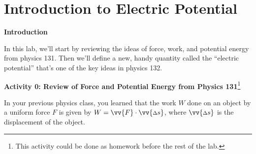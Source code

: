 \section{Introduction to Electric Potential}
\label{potential_intro}


\makelabheader %

\bigskip

\textbf{Introduction} 

In this lab, we'll start by reviewing the ideas of force, work, and potential energy from physics 131.  Then we'll define a new, handy quantity called the ``electric potential'' that's one of the key ideas in physics 132.

\bigskip

\textbf{Activity 0: Review of Force and Potential Energy from Physics 131}\footnote{This activity could be done as homework before the rest of the lab.}

In your previous physics class, you learned that the work $W$ done on an object by a uniform force $F$ is given by $W=\vv{F} \cdot \vv{{\scriptstyle \Delta} s}$, where $\vv{{\scriptstyle \Delta} s}$ is the displacement of the object.

